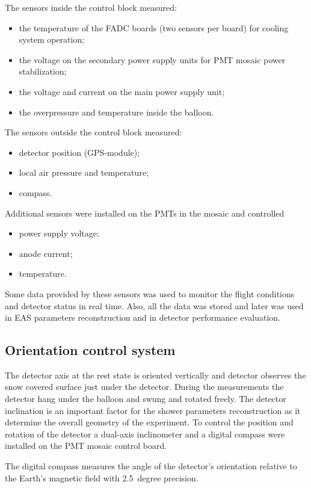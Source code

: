 \documentclass[final,5p,times,twocolumn]{elsarticle}
\begin{document}
The sensors inside the control block measured:
\begin{itemize}[nosep]
\item the temperature of the FADC boards (two sensors per board) for cooling system operation;
\item the voltage on the secondary power supply units for PMT mosaic power stabilization;
\item the voltage and current on the main power supply unit;
\item the overpressure and temperature inside the balloon.
\end{itemize}
The sensors outside the control block measured:
\begin{itemize}[nosep]
\item detector position (GPS-module);
\item local air pressure and temperature;
\item compass.
\end{itemize}
Additional sensors were installed on the PMTs in the mosaic and controlled
\begin{itemize}[nosep]
\item power supply voltage;
\item anode current;
\item temperature.
\end{itemize}

Some data provided by these sensors was used to monitor the flight conditions and detector status in real time. Also, all the data was stored and later was used in EAS parameters reconstruction and in detector performance evaluation.

\subsection{Orientation control system}
\label{sect:orientation}

The detector axis at the rest state is oriented vertically and detector observes the snow covered surface just under the detector. During the measurements the detector hang under the balloon and swung and rotated freely. The detector inclination is an important factor for the shower parameters reconstruction as it determine the overall geometry of the experiment. To control the position and rotation of the detector a dual-axis inclinometer and a digital compass were installed on the PMT mosaic control board. 

The digital compass measures the angle of the detector's orientation relative to the Earth's magnetic field with 2.5~degree precision.
\end{document}
